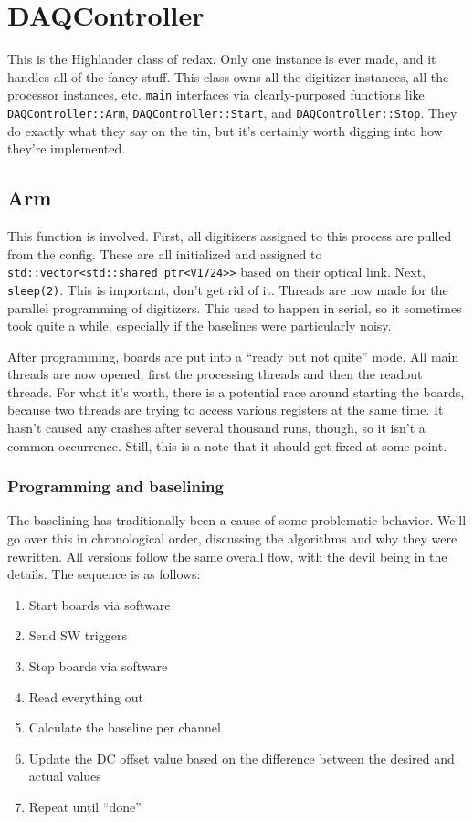 \section{DAQController}

This is the Highlander class of redax.
Only one instance is ever made, and it handles all of the fancy stuff.
This class owns all the digitizer instances, all the processor instances, etc.
\texttt{main} interfaces via clearly-purposed functions like \texttt{DAQController::Arm}, \texttt{DAQController::Start}, and \texttt{DAQController::Stop}.
They do exactly what they say on the tin, but it's certainly worth digging into how they're implemented.

\subsection{Arm}

This function is involved.
First, all digitizers assigned to this process are pulled from the config.
These are all initialized and assigned to \texttt{std::vector<std::shared\_ptr<V1724>>} based on their optical link.
Next, \texttt{sleep(2)}.
This is important, don't get rid of it.
Threads are now made for the parallel programming of digitizers.
This used to happen in serial, so it sometimes took quite a while, especially if the baselines were particularly noisy.

After programming, boards are put into a ``ready but not quite'' mode.
All main threads are now opened, first the processing threads and then the readout threads.
For what it's worth, there is a potential race around starting the boards, because two threads are trying to access various registers at the same time.
It hasn't caused any crashes after several thousand runs, though, so it isn't a common occurrence.
Still, this is a note that it should get fixed at some point.

\subsubsection{Programming and baselining}\label{sec:baseline}

The baselining has traditionally been a cause of some problematic behavior.
We'll go over this in chronological order, discussing the algorithms and why they were rewritten.
All versions follow the same overall flow, with the devil being in the details.
The sequence is as follows:
\begin{enumerate}
  \item Start boards via software
  \item Send SW triggers
  \item Stop boards via software
  \item Read everything out
  \item Calculate the baseline per channel
  \item Update the DC offset value based on the difference between the desired and actual values
  \item Repeat until ``done''
\end{enumerate}

